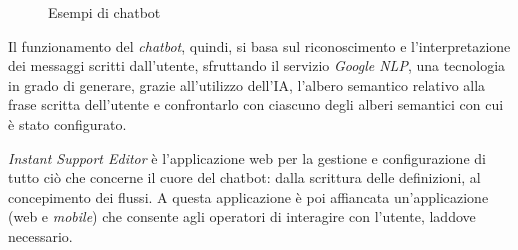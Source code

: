 \begin{figure}[ht]
    \centering{}
    \qquad
    \caption{Esempi di chatbot}
    \label{fig:chatbot-types}
\end{figure}

Il funzionamento del \textit{chatbot}, quindi, si basa sul riconoscimento e l'interpretazione dei messaggi scritti dall'utente, sfruttando il servizio \textit{Google NLP}, una tecnologia in grado di generare, grazie all'utilizzo dell'IA, l'albero semantico relativo alla frase scritta dell'utente e confrontarlo con ciascuno degli alberi semantici con cui è stato configurato.

\textit{Instant Support Editor} è l'applicazione web per la gestione e configurazione di tutto ciò che concerne il cuore del chatbot: dalla scrittura delle definizioni, al concepimento dei flussi.
%
A questa applicazione è poi affiancata un'applicazione (web e \textit{mobile}) che consente agli operatori di interagire con l'utente, laddove necessario.

